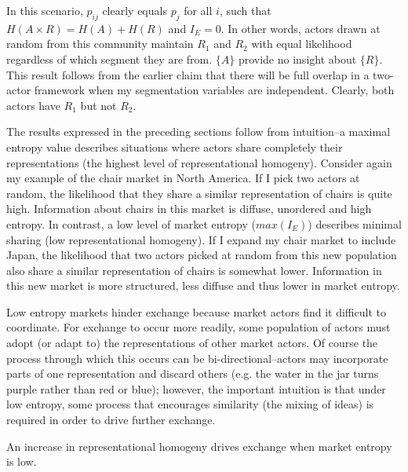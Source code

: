 In this scenario, $p_{ij}$ clearly equals $p_j$ for all $i$, such that $H(A \times R) = H(A) + H(R)$ and $I_E = 0$. In other words, actors drawn at random from this community maintain $R_1$ and $R_2$ with equal likelihood regardless of which segment they are from. $\{A\}$ provide no insight about $\{R\}$. This result follows from the earlier claim that there will be full overlap in a two-actor framework when my segmentation variables are independent. Clearly, both actors have $R_1$ but not $R_2$.
 
The results expressed in the preceding sections follow from intuition--a maximal entropy value describes situations where actors share completely their representations (the highest level of representational homogeny). Consider again my example of the chair market in North America. If I pick two actors at random, the likelihood that they share a similar representation of chairs is quite high. Information about chairs in this market is diffuse, unordered and high entropy. In contrast, a low level of market entropy ($max(I_E)$) describes minimal sharing (low representational homogeny). If I expand my chair market to include Japan, the likelihood that two actors picked at random from this new population also share a similar representation of chairs is somewhat lower. Information in this new market is more structured, less diffuse and thus lower in market entropy. 
 
Low entropy markets hinder exchange because market actors find it difficult to coordinate. For exchange to occur more readily, some population of actors must adopt (or adapt to) the representations of other market actors. Of course the process through which this occurs can be bi-directional--actors may incorporate parts of one representation and discard others (e.g. the water in the jar turns purple rather than red or blue); however, the important intuition is that under low entropy, some process that encourages similarity (the mixing of ideas) is required in order to drive further exchange.
 
\begin{prop}
An increase in representational homogeny drives exchange when market entropy is low.
\end{prop}


